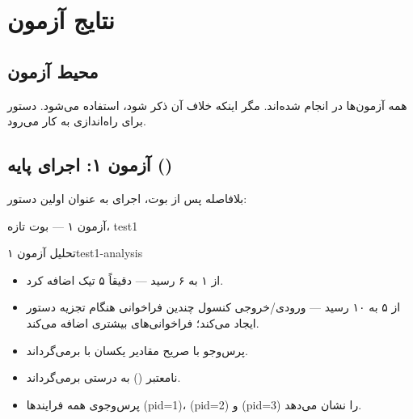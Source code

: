 \documentclass[code]{amznotes-fa}
\begin{document}
\chapter{نتایج آزمون}

\section{محیط آزمون}

همه آزمون‌ها در  انجام شده‌اند. مگر اینکه خلاف آن ذکر شود،  استفاده می‌شود. دستور  برای راه‌اندازی  به کار می‌رود.

\section{آزمون ۱: اجرای پایه ()}

بلافاصله پس از بوت، اجرای  به عنوان اولین دستور:

\begin{codebox}{آزمون ۱ — بوت تازه، }{test1}
\end{codebox}

\begin{exbox}{تحلیل آزمون ۱}{test1-analysis}
    \begin{itemize}[noitemsep]
        \item {} از ۱ به ۶ رسید —  دقیقاً ۵ تیک اضافه کرد.
        \item {} از ۵ به ۱۰ رسید — ورودی/خروجی کنسول چندین فراخوانی  هنگام تجزیه دستور ایجاد می‌کند؛  فراخوانی‌های بیشتری اضافه می‌کند.
        \item پرس‌وجو با  صریح مقادیر یکسان با  برمی‌گرداند.
        \item {} نامعتبر () به درستی  برمی‌گرداند.
        \item پرس‌وجوی همه فرایندها  (pid=1)،  (pid=2) و  (pid=3) را نشان می‌دهد.
    \end{itemize}
\end{exbox}
\end{document}
